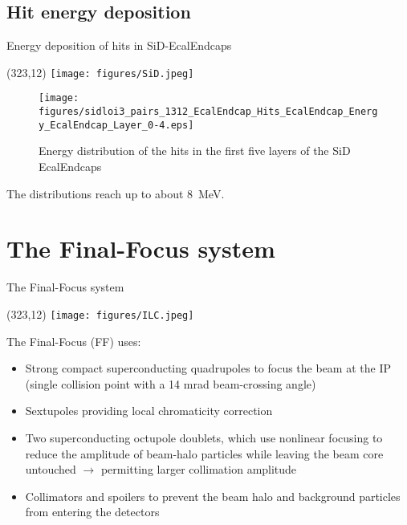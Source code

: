 \documentclass[xcolor={dvipsnames}]{beamer}
\newcommand{\sidlogo}{
  \setlength{\TPHorizModule}{1pt}
  \setlength{\TPVertModule}{1pt}
  \begin{textblock}{1}(323,12)
   \texttt{[image: figures/SiD.jpeg]}
  \end{textblock}
  }
\newcommand{\ilclogo}{
  \setlength{\TPHorizModule}{1pt}
  \setlength{\TPVertModule}{1pt}
  \begin{textblock}{1}(323,12)
   \texttt{[image: figures/ILC.jpeg]}
  \end{textblock}
}
\begin{document}
\subsection{Hit energy deposition}
\begin{frame}{Energy deposition of hits in SiD-EcalEndcaps}
\sidlogo
 \begin{figure}
 \centering
  \texttt{[image: figures/sidloi3\_pairs\_1312\_EcalEndcap\_Hits\_EcalEndcap\_Energy\_EcalEndcap\_Layer\_0-4.eps]}
 \caption{Energy distribution of the hits in the first five layers of the SiD EcalEndcaps}
 \end{figure}
The distributions reach up to about \SI{8}{\mega\electronvolt}.
\end{frame}

\section{The Final-Focus system}
\begin{frame}{The Final-Focus system}
 \ilclogo
 The Final-Focus (FF) uses:
\begin{itemize}
 \item Strong compact superconducting quadrupoles to focus the
beam at the IP (single collision point with a 14 mrad beam-crossing angle)
\item Sextupoles providing local chromaticity correction
\item Two superconducting octupole doublets, which use nonlinear
focusing to reduce the amplitude of beam-halo particles while leaving the beam core untouched $\rightarrow$ permitting larger collimation amplitude
\item Collimators and spoilers to prevent the beam halo and background particles from entering the detectors
\end{itemize}
\end{frame}
\end{document}

